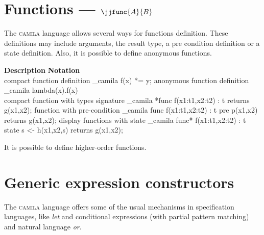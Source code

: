 \documentclass[english,a4paper]{article}
\def\camila{\textsc{camila}}
\begin{document}
\section{Functions --- $\jjfunc{A}{B}$}

The \camila{} language allows several ways for functions definition. These 
definitions may include arguments, the result type, a pre condition definition or
a state definition. Also, it is possible to define anonymous functions.

\begin{framed}
\noindent \textbf{Description}  \hfill  \textbf{Notation} \ \  \\
 compact function definition          \dotfill  \_camila{ f(x) *= y;}
\noindent anonymous function definition        \dotfill  \_camila{ lambda(x).f(x) } \\
 compact function with types signature        \dotfill  \_camila{ *func f(x1:t1,x2:t2) : t
                                                           returns g(x1,x2);} 
\noindent function with pre-condition          \dotfill  \_camila{ func f(x1:t1,x2:t2) : t
                                                          pre p(x1,x2)
                                                          returns g(x1,x2);} 
\noindent display functions with state                 \dotfill  \_camila{ func* f(x1:t1,x2:t2) : t
                                                          state s <- h(x1,x2,s)
                                                          returns g(x1,x2);} 
\end{framed}

It is possible to define higher-order functions.


\section{Generic expression constructors}

The \camila{} language offers some of the usual mechanisms in
specification languages, like \emph{let} and conditional expressions
(with partial pattern matching) and natural language \emph{or}.
\end{document}
